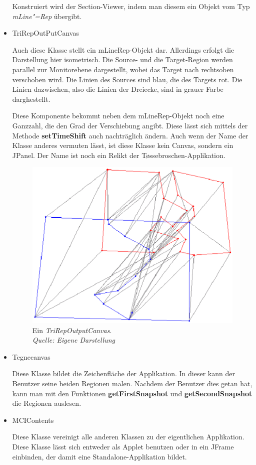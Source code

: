 \begin{itemize}
Konstruiert wird der Section-Viewer, indem man diesem ein Objekt vom Typ \textit{mLine"=Rep} übergibt.


\item TriRepOutPutCanvas

Auch diese Klasse stellt ein mLineRep-Objekt dar. Allerdings erfolgt die Darstellung hier isometrisch. Die Source- und die Target-Region werden parallel zur Monitorebene dargestellt, wobei das Target nach rechtsoben verschoben wird. Die Linien des Sources sind blau, die des Targets rot. Die Linien dazwischen, also die Linien der Dreiecke, sind in grauer Farbe darghestellt.

Diese Komponente bekommt neben dem mLineRep-Objekt noch eine Ganzzahl, die den Grad der Verschiebung angibt. Diese lässt sich mittels der Methode \textbf{setTimeShift} auch nachträglich ändern. Auch wenn der Name der Klasse anderes vermuten lässt, ist diese Klasse kein Canvas, sondern ein JPanel. Der Name ist noch ein Relikt der T\o{}ssebroschen-Applikation.

\begin{figure}
	\centering
	\includegraphics[scale=0.7]{TriRepOutPutCanvas.eps}
	\caption[TriRepOutputCanvas]{Ein \textit{TriRepOutputCanvas}.\\\textit{Quelle: Eigene Darstellung}}
	\label{fig:TriRepOutputCanvas}
\end{figure}




\item Tegnecanvas

Diese Klasse bildet die Zeichenfläche der Applikation. In dieser kann der Benutzer seine beiden Regionen malen. Nachdem der Benutzer dies getan hat, kann man mit den Funktionen \textbf{getFirstSnapshot} und \textbf{getSecondSnapshot} die Regionen auslesen. 

\item MCIContents

Diese Klasse vereinigt alle anderen Klassen zu der eigentlichen Applikation. Diese Klasse lässt sich entweder als Applet benutzen oder in ein JFrame einbinden, der damit eine Standalone-Applikation bildet.
\end{itemize}
